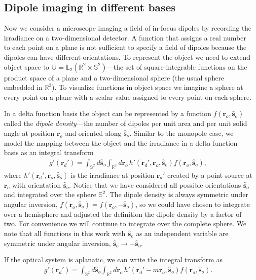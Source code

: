 \documentclass[]{osa-article}
\providecommand{\ro}{\mathbf{\mathbf{r}}_o}
\providecommand{\so}{\mathbf{\hat{s}}_o}
\providecommand{\rd}{\mathbf{r}_d}
\providecommand{\mbb}[1]{\mathbb{#1}}
\begin{document}
\subsection{Dipole imaging in different bases}\label{sec:dipole}
Now we consider a microscope imaging a field of in-focus dipoles by recording
the irradiance on a two-dimensional detector. A function that assigns a real
number to each point on a plane is not sufficient to specify a field of dipoles
because the dipoles can have different orientations. To represent the object we
need to extend object space to
$\mbb{U} = \mbb{L}_2(\mbb{R}^2\times\mbb{S}^2)$---the set of square-integrable
functions on the product space of a plane and a two-dimensional sphere (the
usual sphere embedded in $\mbb{R}^3$). To visualize functions in object space we
imagine a sphere at every point on a plane with a scalar value assigned to every
point on each sphere.

In a delta function basis the object can be represented by a function
$f(\ro, \so)$ called the \textit{dipole density}---the number of dipoles per
unit area and per unit solid angle at position $\ro{}$ and oriented along
$\so{}$. Similar to the monopole case, we model the mapping between the object
and the irradiance in a delta function basis as an integral transform
\begin{align}
  g'(\rd') = \int_{\mbb{S}^2}d\so\int_{\mbb{R}^2}d\ro\, h'(\rd', \ro, \so)f(\ro, \so),
\end{align}
where $h'(\rd', \ro, \so)$ is the irradiance at position $\rd'$ created by a
point source at $\ro$ with orientation $\so$. Notice that we have considered all
possible orientations $\so$ and integrated over the sphere $\mbb{S}^2$. The
dipole density is always symmetric under angular inversion,
$f(\ro, \so) = f(\ro,-\so)$, so we could have chosen to integrate over a
hemisphere and adjusted the definition the dipole density by a factor of two.
For convenience we will continue to integrate over the complete sphere. We note
that all functions in this work with $\so$ as an independent variable are
symmetric under angular inversion, $\so \rightarrow -\so$.

If the optical system is aplanatic, we can write the
integral transform as
\begin{align}
  g'(\rd') = \int_{\mbb{S}^2}d\so\int_{\mbb{R}^2}d\ro\, h'(\rd' - m\ro, \so)f(\ro, \so). 
\end{align}
\end{document}
